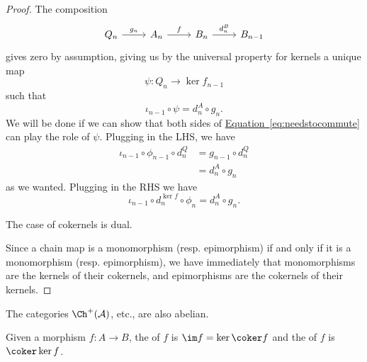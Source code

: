\documentclass[main.tex]{subfiles}
\begin{document}
\begin{proof}
  The composition
  \begin{equation*}
    \begin{tikzcd}
      Q_{n}
      \arrow[r, "g_{n}"]
      & A_{n}
      \arrow[r, "f"]
      & B_{n}
      \arrow[r, "d_{n}^{B}"]
      & B_{n-1}
    \end{tikzcd}
  \end{equation*}
  gives zero by assumption, giving us by the universal property for kernels a unique map
  \begin{equation*}
    \psi\colon Q_{n} \to \ker f_{n-1}
  \end{equation*}
  such that
  \begin{equation*}
    \iota_{n-1} \circ \psi = d^{A}_{n} \circ g_{n}.
  \end{equation*}
  We will be done if we can show that both sides of \hyperref[eq:needstocommute]{Equation~\ref*{eq:needstocommute}} can play the role of $\psi$. Plugging in the LHS, we have
  \begin{align*}
    \iota_{n-1} \circ \phi_{n-1} \circ d^{Q}_{n} &= g_{n-1} \circ d^{Q}_{n} \\
    &= d^{A}_{n} \circ g_{n}
  \end{align*}
  as we wanted. Plugging in the RHS we have
  \begin{equation*}
    \iota_{n-1} \circ d^{\ker f}_{n} \circ \phi_{n} = d^{A}_{n} \circ g_{n}.
  \end{equation*}

  The case of cokernels is dual.

  Since a chain map is a monomorphism (resp. epimorphism) if and only if it is a monomorphism (resp. epimorphism), we have immediately that monomorphisms are the kernels of their cokernels, and epimorphisms are the cokernels of their kernels.
\end{proof}

The categories $\Ch^{+}(\mathcal{A})$, etc., are also abelian.

\begin{definition}
  \label{def:image_coimage}
  Given a morphism $f\colon A \to B$, the  of $f$ is $\im f = \ker\coker f$ and the  of $f$ is $\coker \ker f$. 
\end{definition}
  
\end{document}

